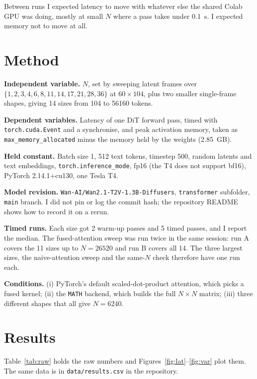 \documentclass[11pt]{article}
\begin{document}
Between runs I expected latency to move with whatever else the shared Colab GPU was doing, mostly at small $N$ where a pass takes under \SI{0.1}{s}. I expected memory not to move at all.

\section{Method}

\textbf{Independent variable.} $N$, set by sweeping latent frames over $\{1,2,3,4,6,8,11,14,17,21,28,36\}$ at $60 \times 104$, plus two smaller single-frame shapes, giving 14 sizes from 104 to \num{56160} tokens.

\textbf{Dependent variables.} Latency of one DiT forward pass, timed with \texttt{torch.cuda.Event} and a synchronise, and peak activation memory, taken as \texttt{max\_memory\_allocated} minus the memory held by the weights (\SI{2.85}{GB}).

\textbf{Held constant.} Batch size 1, 512 text tokens, timestep 500, random latents and text embeddings, \texttt{torch.inference\_mode}, fp16 (the T4 does not support bf16), PyTorch 2.14.1+cu130, one Tesla T4.

\textbf{Model revision.} \texttt{Wan-AI/Wan2.1-T2V-1.3B-Diffusers}, \texttt{transformer} subfolder, \texttt{main} branch. I did not pin or log the commit hash; the repository README shows how to record it on a rerun.

\textbf{Timed runs.} Each size got 2 warm-up passes and 5 timed passes, and I report the median. The fused-attention sweep was run twice in the same session: run A covers the 11 sizes up to $N = \num{26520}$ and run B covers all 14. The three largest sizes, the naive-attention sweep and the same-$N$ check therefore have one run each.

\textbf{Conditions.} (i) PyTorch's default scaled-dot-product attention, which picks a fused kernel; (ii) the \texttt{MATH} backend, which builds the full $N \times N$ matrix; (iii) three different shapes that all give $N = \num{6240}$.

\section{Results}

Table~\ref{tab:raw} holds the raw numbers and Figures~\ref{fig:lat}--\ref{fig:var} plot them. The same data is in \texttt{data/results.csv} in the repository.
\end{document}

